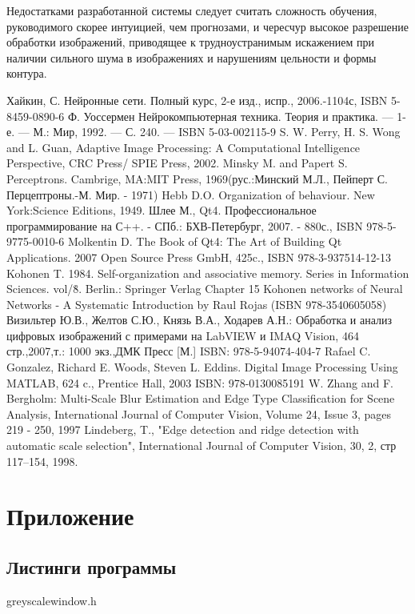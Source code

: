 \documentclass[a4paper,12pt]{report}
\begin{document}
Недостатками разработанной системы следует считать сложность обучения, руководимого скорее интуицией, чем прогнозами, и чересчур высокое разрешение обработки изображений, приводящее к трудноустранимым искажением при наличии сильного шума в изображениях и нарушениям цельности и формы контура.

\begin{thebibliography}{99}
Хайкин, С. Нейронные сети. Полный курс, 2-е изд., испр., 2006.-1104с, ISBN 5-8459-0890-6
Ф. Уоссермен Нейрокомпьютерная техника. Теория и практика. — 1-е. — М.: Мир, 1992. — С. 240. — ISBN 5-03-002115-9
S. W. Perry, H. S. Wong and L. Guan, Adaptive Image Processing: A Computational Intelligence Perspective, CRC Press/ SPIE Press, 2002.
Minsky M. and Papert S. Perceptrons. Cambrige, MA:MIT Press, 1969(рус.:Минский М.Л., Пейперт С. Перцептроны.-М. Мир. - 1971)
Hebb D.O. Organization of behaviour. New York:Science Editions, 1949.
Шлее М., Qt4. Профессиональное программирование на С++. - СПб.: БХВ-Петербург, 2007. - 880с., ISBN 978-5-9775-0010-6
Molkentin D. The Book of Qt4: The Art of Building Qt Applications. 2007 Open Source Press GmbH, 425c., ISBN 978-3-937514-12-13
Kohonen T. 1984. Self-organization and associative memory. Series in Information Sciences. vol/\.8. Berlin.: Springer Verlag
Chapter 15 Kohonen networks of Neural Networks - A Systematic Introduction by Raul Rojas (ISBN 978-3540605058)
Визильтер Ю.В., Желтов С.Ю., Князь В.А., Ходарев А.Н.: Обработка и анализ цифровых изображений с примерами на LabVIEW и IMAQ Vision, 464 стр.,2007,т.: 1000 экз.,ДМК Пресс [М.] ISBN: 978-5-94074-404-7
Rafael C. Gonzalez, Richard E. Woods, Steven L. Eddins. Digital Image Processing Using MATLAB, 624 c., Prentice Hall, 2003 ISBN: 978-0130085191
W. Zhang and F. Bergholm: Multi-Scale Blur Estimation and Edge Type Classification for Scene Analysis, International Journal of Computer Vision, Volume 24, Issue 3, pages 219 - 250, 1997
Lindeberg, T., "Edge detection and ridge detection with automatic scale selection", International Journal of Computer Vision, 30, 2, стр 117--154, 1998. 
\end{thebibliography}
\chapter{Приложение}
\section{Листинги программы}
\footnotesize greyscalewindow.h
\lstset{numbers=left,language=[ANSI]C++}

\end{document}
